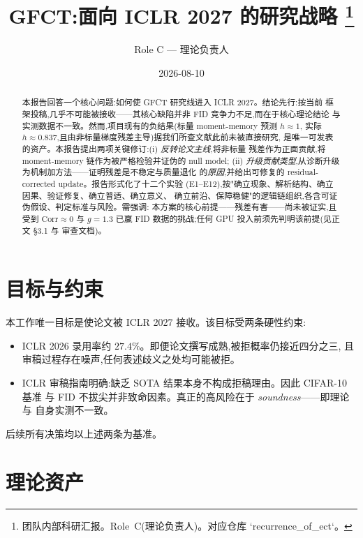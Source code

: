 \documentclass[UTF8,11pt,a4paper]{ctexart}
\title{\textbf{GFCT:面向 ICLR 2027 的研究战略}%
\thanks{团队内部科研汇报。Role~C(理论负责人)。对应仓库 `recurrence\_of\_ect`。}}
\author{Role C --- 理论负责人}
\date{2026-08-10}
\begin{document}
\maketitle

\begin{abstract}
本报告回答一个核心问题:如何使 GFCT 研究线进入 ICLR 2027。结论先行:按当前
框架投稿,几乎不可能被接收——其核心缺陷并非 FID 竞争力不足,而在于核心理论结论
与实测数据不一致。然而,项目现有的负结果(标量 moment-memory 预测 $h\approx1$,
实际 $h\approx0.837$,且由非标量梯度残差主导)据我们所查文献此前未被直接研究,
是唯一可发表的资产。本报告提出两项关键修订:(i) \emph{反转论文主线},将非标量
残差作为正面贡献,将 moment-memory 链作为被严格检验并证伪的 null model;
(ii) \emph{升级贡献类型},从诊断升级为机制加方法——证明残差是不稳定与质量退化
的\emph{原因},并给出可修复的 residual-corrected update。报告形式化了十二个实验
(E1--E12),按"确立现象、解析结构、确立因果、验证修复、确立普适、确立意义、
确立前沿、保障稳健"的逻辑链组织,各含可证伪假设、判定标准与风险。需强调:
本方案的核心前提——残差有害——尚未被证实,且受到 $\mathrm{Corr}\approx 0$ 与
$g{=}1.3$ 已赢 FID 数据的挑战;任何 GPU 投入前须先判明该前提(见正文 §3.1 与
审查文档)。
\end{abstract}

\tableofcontents

\section{目标与约束}
\label{sec:purpose}

本工作唯一目标是使论文被 ICLR 2027 接收。该目标受两条硬性约束:

\begin{itemize}
  \item ICLR 2026 录用率约 $27.4\%$。即便论文撰写成熟,被拒概率仍接近四分之三,
        且审稿过程存在噪声,任何表述歧义之处均可能被拒。
  \item ICLR 审稿指南明确:缺乏 SOTA 结果本身不构成拒稿理由。因此 CIFAR-10 基准
        与 FID 不拔尖并非致命因素。真正的高风险在于 \emph{soundness}——即理论与
        自身实测不一致。
\end{itemize}

后续所有决策均以上述两条为基准。

\section{理论资产}
\label{sec:intro}
\end{document}
